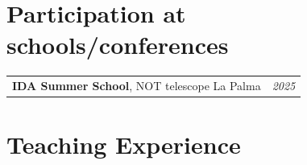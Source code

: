 \documentclass[a4paper, 11pt]{article}
\begin{document}
\section{Participation at schools/conferences}
\begin{tabularx}{\linewidth}{@{}X r@{}}	
\textbf{IDA Summer School}, NOT telescope La Palma & \hfill \textit{2025} 
\end{tabularx}


\vspace{0.1cm}

\section{Teaching Experience}
\end{document}

